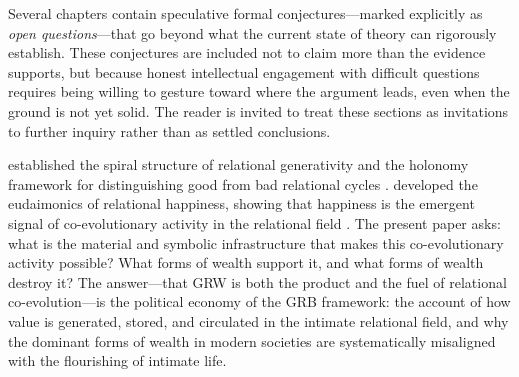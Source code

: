 Several chapters contain speculative formal conjectures---marked explicitly as \emph{open questions}---that go beyond what the current state of theory can rigorously establish. These conjectures are included not to claim more than the evidence supports, but because honest intellectual engagement with difficult questions requires being willing to gesture toward where the argument leads, even when the ground is not yet solid. The reader is invited to treat these sections as invitations to further inquiry rather than as settled conclusions.

  established the spiral structure of relational generativity and the holonomy framework for distinguishing good from bad relational cycles \parencite{paperix}.  developed the eudaimonics of relational happiness, showing that happiness is the emergent signal of co-evolutionary activity in the relational field \parencite{paperxiv}. The present paper asks: what is the material and symbolic infrastructure that makes this co-evolutionary activity possible? What forms of wealth support it, and what forms of wealth destroy it? The answer---that GRW is both the product and the fuel of relational co-evolution---is the political economy of the GRB framework: the account of how value is generated, stored, and circulated in the intimate relational field, and why the dominant forms of wealth in modern societies are systematically misaligned with the flourishing of intimate life.
